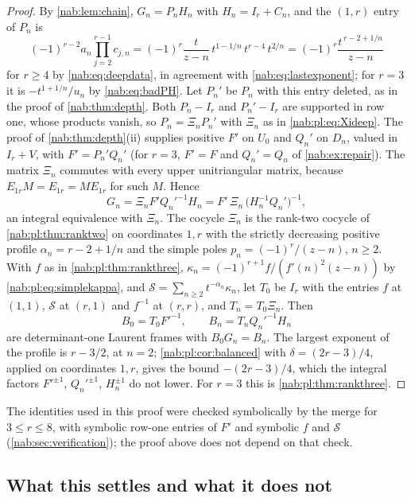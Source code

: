 \documentclass[11pt,letterpaper]{article}
\theoremstyle{definition}
\theoremstyle{remark}
\numberwithin{equation}{section}
\begin{document}
\begin{proof}
By \cref{nab:lem:chain}, $G_n=P_nH_n$ with $H_n=I_r+C_n$, and the $(1,r)$
entry of $P_n$ is
\[
 (-1)^{r-2}a_n\prod_{j=2}^{r-1}c_{j,n}
 =(-1)^r\frac{t}{z-n}\,t^{1-1/n}\,t^{r-4}\,t^{2/n}
 =(-1)^r\frac{t^{\,r-2+1/n}}{z-n}
\]
for $r\geq4$ by \eqref{nab:eq:deepdata}, in agreement with
\eqref{nab:eq:lastexponent}; for $r=3$ it is $-t^{1+1/n}/u_n$ by
\eqref{nab:eq:badPH}. Let $P_n'$ be $P_n$ with this entry deleted, as in the
proof of \cref{nab:thm:depth}. Both $P_n-I_r$ and $P_n'-I_r$ are supported in
row one, whose products vanish, so $P_n=\Xi_nP_n'$ with $\Xi_n$ as in
\eqref{nab:pl:eq:Xideep}. The proof of \cref{nab:thm:depth}(ii) supplies
positive $F'$ on $U_0$ and $Q_n'$ on $D_n$, valued in $I_r+V$, with
$F'=P_n'Q_n'$ (for $r=3$, $F'=F$ and $Q_n'=Q_n$ of \cref{nab:ex:repair}). The
matrix $\Xi_n$ commutes with every upper unitriangular matrix, because
$E_{1r}M=E_{1r}=ME_{1r}$ for such $M$. Hence
\[
 G_n=\Xi_nF'Q_n'^{-1}H_n=F'\,\Xi_n\,\bigl(H_n^{-1}Q_n'\bigr)^{-1},
\]
an integral equivalence with $\Xi_n$. The cocycle $\Xi_n$ is the rank-two
cocycle of \cref{nab:pl:thm:ranktwo} on coordinates $1,r$ with the strictly
decreasing positive profile $\alpha_n=r-2+1/n$ and the simple poles
$p_n=(-1)^r/(z-n)$, $n\geq2$. With $f$ as in \cref{nab:pl:thm:rankthree},
$\kappa_n=(-1)^{r+1}f/(f'(n)^2(z-n))$ by \eqref{nab:pl:eq:simplekappa}, and
$\mathcal S=\sum_{n\geq2}t^{-\alpha_n}\kappa_n$, let $T_0$ be $I_r$ with the
entries $f$ at $(1,1)$, $\mathcal S$ at $(r,1)$ and $f^{-1}$ at $(r,r)$, and
$T_n=T_0\Xi_n$. Then
\[
 B_0=T_0F'^{-1},\qquad B_n=T_nQ_n'^{-1}H_n
\]
are determinant-one Laurent frames with $B_0G_n=B_n$. The largest exponent of
the profile is $r-3/2$, at $n=2$; \cref{nab:pl:cor:balanced} with
$\delta=(2r-3)/4$, applied on coordinates $1,r$, gives the bound
$-(2r-3)/4$, which the integral factors $F'^{\pm1}$, $Q_n'^{\pm1}$,
$H_n^{\pm1}$ do not lower. For $r=3$ this is \cref{nab:pl:thm:rankthree}.
\end{proof}

The identities used in this proof were checked symbolically by the merge for
$3\leq r\leq8$, with symbolic row-one entries of $F'$ and symbolic $f$ and
$\mathcal S$ (\cref{nab:sec:verification}); the proof above does not depend on
that check.

\subsection{What this settles and what it does not}
\end{document}
